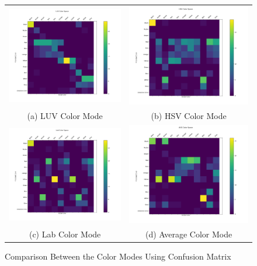 \begin{figure}[htb!]
  \centering
\begin{tabular}{cc}
 \includegraphics[width=0.4\linewidth]{image/retrievalTwo/luvCM.png} & 
  \includegraphics[width=0.4\linewidth]{image/retrievalTwo/hsvCM.png} \\
 (a) LUV Color Mode & (b) HSV Color Mode \\
 \includegraphics[width=0.4\linewidth]{image/retrievalTwo/labCM.png} &
 \includegraphics[width=0.4\linewidth]{image/retrievalTwo/avgCM.png} \\
(c) Lab Color Mode & (d) Average Color Mode \\
\end{tabular}
\caption{Comparison Between the Color Modes Using Confusion Matrix} \label{fig:colorspace_Confuscore}
\end{figure}

